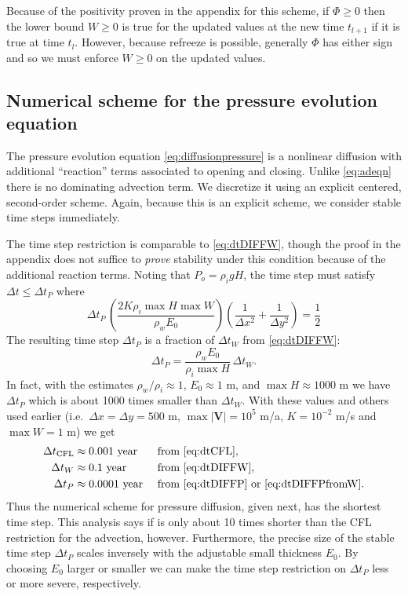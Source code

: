 \documentclass[11pt,final]{amsart}%
\newcommand\bV{\mathbf{V}}
\begin{document}
Because of the positivity proven in the appendix for this scheme, if $\Phi\ge 0$ then the lower bound $W\ge 0$ is true for the updated values at the new time $t_{l+1}$ if it is true at time $t_l$.  However, because refreeze is possible, generally $\Phi$ has either sign and so we must enforce $W\ge 0$ on the updated values.

\subsection*{Numerical scheme for the pressure evolution equation}  The pressure evolution equation \eqref{eq:diffusionpressure} is a nonlinear diffusion with additional ``reaction'' terms associated to opening and closing.  Unlike \eqref{eq:adeqn} there is no dominating advection term.  We discretize it using an explicit centered, second-order scheme.  Again, because this is an explicit scheme, we consider stable time steps immediately.

The time step restriction is comparable to \eqref{eq:dtDIFFW}, though the proof in the appendix does not suffice to \emph{prove} stability under this condition because of the additional reaction terms.  Noting that $P_o=\rho_i g H$, the time step must satisfy $\Delta t \le \Delta t_P$ where
\begin{equation}
\Delta t_P\, \left(\frac{2 K \rho_i \max H \max W}{\rho_w E_0}\right) \left(\frac{1}{\Delta x^2} + \frac{1}{\Delta y^2}\right) = \frac{1}{2} \label{eq:dtDIFFP}
\end{equation}
The resulting time step $\Delta t_P$ is a fraction of $\Delta t_W$ from \eqref{eq:dtDIFFW}:
\begin{equation}
\Delta t_P = \frac{\rho_w E_0}{\rho_i \max H}\, \Delta t_W.  \label{eq:dtDIFFPfromW}
\end{equation}
In fact, with the estimates $\rho_w/\rho_i \approx 1$, $E_0\approx 1$ m, and $\max H \approx 1000$ m we have $\Delta t_P$ which is about 1000 times smaller than $\Delta t_W$.  With these values and others used earlier (i.e.~$\Delta x = \Delta y = 500$ m, $\max |\bV|=10^5$ m/a, $K=10^{-2}$ m/s and $\max W=1$ m) we get
\begin{align*}
  \Delta t_{\text{CFL}} &\approx 0.001  \text{ year} &&\text{ from \eqref{eq:dtCFL}}, \\
  \Delta t_W            &\approx 0.1    \text{ year} &&\text{ from \eqref{eq:dtDIFFW}}, \\
  \Delta t_P            &\approx 0.0001 \text{ year} &&\text{ from \eqref{eq:dtDIFFP} or \eqref{eq:dtDIFFPfromW}.}
\end{align*}
Thus the numerical scheme for pressure diffusion, given next, has the shortest time step.  This analysis says if is only about 10 times shorter than the CFL restriction for the advection, however.  Furthermore, the precise size of the stable time step $\Delta t_P$ scales inversely with the adjustable small thickness $E_0$.  By choosing $E_0$ larger or smaller we can make the time step restriction on $\Delta t_P$ less or more severe, respectively.
\end{document}
